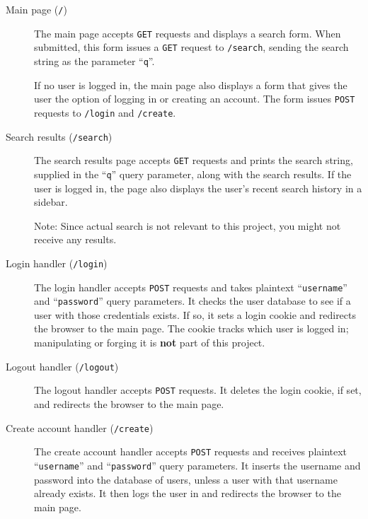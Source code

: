 \documentclass[letterpaper,12pt]{article}
\begin{document}
{\begin{description}

\item[Main page (\texttt{/})]

The main page accepts \texttt{GET} requests and displays a search form. When submitted, this form issues a \texttt{GET} request to \texttt{/search}, sending the search string as the parameter ``\texttt{q}''.  

If no user is logged in, the main page also displays a form that gives the user the option of logging in or creating an account.  The form issues \texttt{POST} requests to \texttt{/login} and \texttt{/create}.

\item[Search results (\texttt{/search})]

The search results page accepts \texttt{GET} requests and prints the search string, supplied in the ``\texttt{q}'' query parameter, along with the search results.   If the user is logged in, the page also displays the user's recent search history in a sidebar.

{Note: Since actual search is not relevant to this project, you might not receive any results.}

\item[Login handler (\texttt{/login})]

The login handler accepts \texttt{POST} requests and takes plaintext ``\texttt{username}'' and ``\texttt{password}'' query parameters.  It checks the user database to see if a user with those credentials exists.  If so, it sets a login cookie and redirects the browser to the main page.  The cookie tracks which user is logged in; manipulating or forging it is \textbf{not} part of this project.

\item[Logout handler (\texttt{/logout})]

The logout handler accepts \texttt{POST} requests.  It deletes the login cookie, if set, and redirects the browser to the main page.
\smallskip

\item[Create account handler (\texttt{/create})]

The create account handler accepts \texttt{POST} requests and receives plaintext ``\texttt{username}'' and ``\texttt{password}'' query parameters.  It inserts the username and password into the database of users, unless a user with that username already exists.  It then logs the user in and redirects the browser to the main page.


\end{description}}
\end{document}
